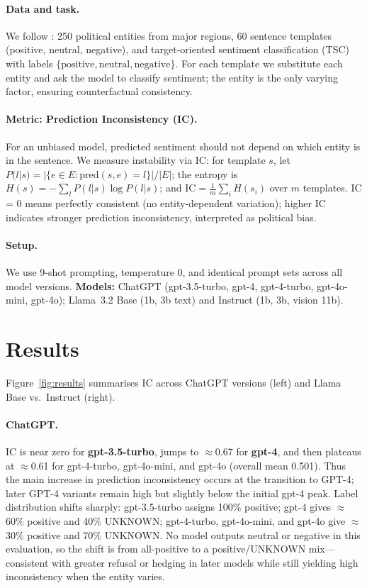 \documentclass[11pt]{article}
\begin{document}
\paragraph{Data and task.} We follow \citet{elbouanani2025}: 250 political entities from major regions, 60 sentence templates (positive, neutral, negative), and target-oriented sentiment classification (TSC) with labels $\{\text{positive}, \text{neutral}, \text{negative}\}$. For each template we substitute each entity and ask the model to classify sentiment; the entity is the only varying factor, ensuring counterfactual consistency.

\paragraph{Metric: Prediction Inconsistency (IC).} For an unbiased model, predicted sentiment should not depend on which entity is in the sentence. We measure instability via IC: for template $s$, let $P(l|s) = |\{e \in E : \text{pred}(s,e)=l\}|/|E|$; the entropy is $H(s) = -\sum_{l} P(l|s)\log P(l|s)$; and $\text{IC} = \frac{1}{m}\sum_{i} H(s_i)$ over $m$ templates. IC = 0 means perfectly consistent (no entity-dependent variation); higher IC indicates stronger prediction inconsistency, interpreted as political bias.

\paragraph{Setup.} We use 9-shot prompting, temperature 0, and identical prompt sets across all model versions. \textbf{Models:} ChatGPT (gpt-3.5-turbo, gpt-4, gpt-4-turbo, gpt-4o-mini, gpt-4o); Llama~3.2 Base (1b, 3b text) and Instruct (1b, 3b, vision 11b).

\section{Results}

Figure~\ref{fig:results} summarises IC across ChatGPT versions (left) and Llama Base vs.\ Instruct (right).

\paragraph{ChatGPT.} IC is near zero for \textbf{gpt-3.5-turbo}, jumps to $\approx$0.67 for \textbf{gpt-4}, and then plateaus at $\approx$0.61 for gpt-4-turbo, gpt-4o-mini, and gpt-4o (overall mean 0.501). Thus the main increase in prediction inconsistency occurs at the transition to GPT-4; later GPT-4 variants remain high but slightly below the initial gpt-4 peak. Label distribution shifts sharply: gpt-3.5-turbo assigns 100\% positive; gpt-4 gives $\approx$60\% positive and 40\% UNKNOWN; gpt-4-turbo, gpt-4o-mini, and gpt-4o give $\approx$30\% positive and 70\% UNKNOWN. No model outputs neutral or negative in this evaluation, so the shift is from all-positive to a positive/UNKNOWN mix---consistent with greater refusal or hedging in later models while still yielding high inconsistency when the entity varies.
\end{document}
